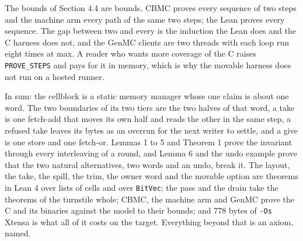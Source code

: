 The bounds of Section 4.4 are bounds. CBMC proves every sequence of two steps and the machine arm every path of the same two steps; the Lean proves every sequence. The gap between two and every is the induction the Lean does and the C harness does not, and the GenMC clients are two threads with each loop run eight times at max. A reader who wants more coverage of the C raises \texttt{PROVE\_\allowbreak{}STEPS} and pays for it in memory, which is why the movable harness does not run on a hosted runner.

In sum: the cellblock is a static memory manager whose one claim is about one word. The two boundaries of its two tiers are the two halves of that word, a take is one fetch-add that moves its own half and reads the other in the same step, a refused take leaves its bytes as an overrun for the next writer to settle, and a give is one store and one fetch-or. Lemmas 1 to 5 and Theorem 1 prove the invariant through every interleaving of a round, and Lemma 6 and the undo example prove that the two natural alternatives, two words and an undo, break it. The layout, the take, the spill, the trim, the owner word and the movable option are theorems in Lean 4 over lists of cells and over \texttt{Bit\allowbreak{}Vec}; the pass and the drain take the theorems of the turnstile whole; CBMC, the machine arm and GenMC prove the C and its binaries against the model to their bounds; and 778 bytes of \texttt{-\allowbreak{}Os} Xtensa is what all of it costs on the target. Everything beyond that is an axiom, named.
